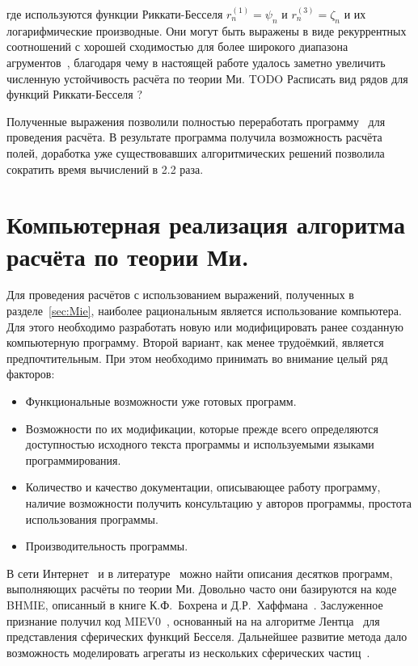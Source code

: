 где используются функции Риккати-Бесселя $r_n^{(1)} = \psi_n$ и
$r_n^{(3)} = \zeta_n$ и их логарифмические производные. Они могут быть
выражены в виде рекуррентных соотношений с хорошей сходимостью для
более широкого диапазона
агрументов~\cite{Wiscombe-1980,Mackowski-1990}, благодаря чему в
настоящей работе удалось заметно увеличить численную устойчивость
расчёта по теории Ми.  TODO Расписать вид рядов для функций
Риккати-Бесселя ?

Полученные выражения позволили полностью переработать
программу~\cite{Scattnlay-web} для проведения расчёта.  В результате
программа получила возможность расчёта полей, доработка уже
существовавших алгоритмических решений позволила сократить время
вычислений в 2.2 раза.

\section{Компьютерная реализация алгоритма расчёта по теории Ми.}
\label{sec:code}

Для проведения расчётов с использованием выражений, полученных в
разделе~\ref{sec:Mie}, наиболее рациональным является использование
компьютера.  Для этого необходимо разработать новую или модифицировать
ранее созданную компьютерную программу. Второй вариант, как менее
трудоёмкий, является предпочтительным.  При этом необходимо принимать
во внимание целый ряд факторов:
\begin{itemize}
\item Функциональные возможности уже готовых программ.
\item Возможности по их модификации, которые прежде всего определяются
  доступностью исходного текста программы и используемыми языками программирования.
\item Количество и качество документации, описывающее работу
  программу, наличие возможности получить консультацию у авторов
  программы, простота использования программы.
\item Производительность программы.
\end{itemize}

В сети Интернет~\cite{scattport,wiki-mie-codes} и в
литературе~\cite{Wriedt-2009} можно найти описания десятков программ,
выполняющих расчёты по теории Ми.  Довольно часто они базируются на
коде BHMIE, описанный в книге К.Ф.~Бохрена и
Д.Р.~Хаффмана~\cite{Bohren-1983}.  Заслуженное признание получил код
MIEV0~\cite{Wiscombe-1980}, основанный на на алгоритме
Лентца~\cite{Lentz-76} для представления сферических функций
Бесселя. Дальнейшее развитие метода дало возможность моделировать
агрегаты из нескольких сферических частиц~\cite{Mackowski-96,Xu-95}.

